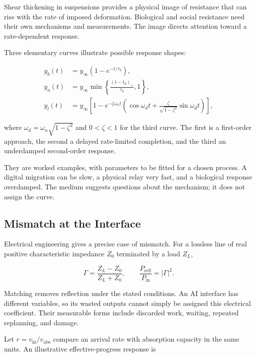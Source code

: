 Shear thickening in suspensions provides a physical image of resistance that can rise with the rate of imposed deformation.\cite{brown2014shear} Biological and social resistance need their own mechanisms and measurements. The image directs attention toward a rate-dependent response.

Three elementary curves illustrate possible response shapes:

\begin{align}
y_b(t)&=y_\infty(1-e^{-t/\tau_b}),\label{eq:resp-bit}\\
y_a(t)&=y_\infty\min\left\{\frac{(t-t_d)_+}{\tau_a},1\right\},\label{eq:resp-atom}\\
y_l(t)&=y_\infty\left[1-e^{-\zeta\omega_n t}
\left(\cos\omega_dt+\frac{\zeta}{\sqrt{1-\zeta^2}}\sin\omega_dt\right)\right],
\label{eq:resp-life}
\end{align}

where $\omega_d=\omega_n\sqrt{1-\zeta^2}$ and $0<\zeta<1$ for the third curve. The first is a first-order approach, the second a delayed rate-limited completion, and the third an underdamped second-order response.

They are worked examples, with parameters to be fitted for a chosen process. A digital migration can be slow, a physical relay very fast, and a biological response overdamped. The medium suggests questions about the mechanism; it does not assign the curve.

\subsection{Mismatch at the Interface}


Electrical engineering gives a precise case of mismatch. For a lossless line of real positive characteristic impedance $Z_0$ terminated by a load $Z_L$,

\begin{equation}
\Gamma=\frac{Z_L-Z_0}{Z_L+Z_0},
\qquad
\frac{P_{\mathrm{refl}}}{P_{\mathrm{in}}}=|\Gamma|^2.
\end{equation}

Matching removes reflection under the stated conditions. An AI interface has different variables, so its wasted outputs cannot simply be assigned this electrical coefficient. Their measurable forms include discarded work, waiting, repeated replanning, and damage.

Let $r=v_{\mathrm{in}}/v_{\mathrm{abs}}$ compare an arrival rate with absorption capacity in the same units. An illustrative effective-progress response is


